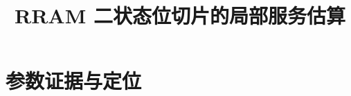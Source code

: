 \documentclass[11pt,a4paper,fontset=fandol]{ctexart}
\title{\bfseries RRAM 二状态位切片的局部服务估算}
\author{}\date{}
\begin{document}
\maketitle\vspace{-2em}


\FloatBarrier
\clearpage
\section*{参数证据与定位}

\end{document}
